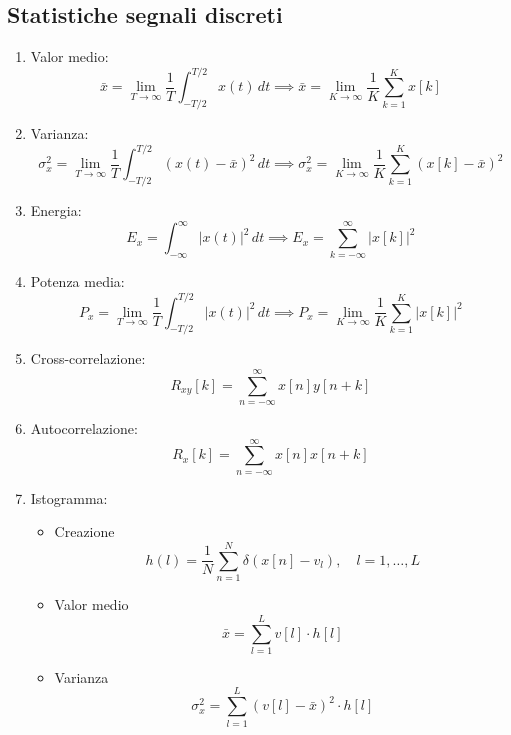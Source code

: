 \subsection{Statistiche segnali discreti}
\begin{enumerate}

	\item Valor medio:
	      \[
		      \bar{x} = \lim_{T \to \infty} \frac{1}{T} \int_{-T/2}^{T/2} x(t) \, dt \implies \bar{x} = \lim_{K \to \infty} \frac{1}{K} \sum_{k=1}^{K} x[k]
	      \]

	\item Varianza:
	      \[
		      \sigma_x^2 = \lim_{T \to \infty} \frac{1}{T} \int_{-T/2}^{T/2} \left(x(t) - \bar{x}\right)^2 \, dt \implies \sigma_x^2 = \lim_{K \to \infty} \frac{1}{K} \sum_{k=1}^{K} \left(x[k] - \bar{x}\right)^2
	      \]

	\item Energia:
	      \[
		      E_x = \int_{-\infty}^{\infty} |x(t)|^2 \, dt \implies E_x = \sum_{k=-\infty}^{\infty} |x[k]|^2
	      \]

	\item Potenza media:
	      \[
		      P_x = \lim_{T \to \infty} \frac{1}{T} \int_{-T/2}^{T/2} |x(t)|^2 \, dt \implies P_x = \lim_{K \to \infty} \frac{1}{K} \sum_{k=1}^{K} |x[k]|^2
	      \]

	\item Cross-correlazione:
	      \[
		      R_{xy}[k] = \sum_{n=-\infty}^{\infty} x[n] y[n+k]
	      \]

	\item Autocorrelazione:
	      \[
		      R_x[k] = \sum_{n=-\infty}^{\infty} x[n] x[n+k]
	      \]

	\item Istogramma:
	      \begin{itemize}

		      \item Creazione \[
			            h(l) = \frac{1}{N} \sum_{n=1}^{N} \delta(x[n] - v_l), \quad l = 1, \dots, L
		            \]
		      \item Valor medio
		            \[
			            \bar{x}=\sum_{l=1}^L v[l] \cdot h[l]
		            \]
		      \item Varianza
		            \[
			            \sigma_x^2=\sum_{l=1}^L(v[l]-\bar{x})^2 \cdot h[l]
		            \]
	      \end{itemize}

\end{enumerate}

